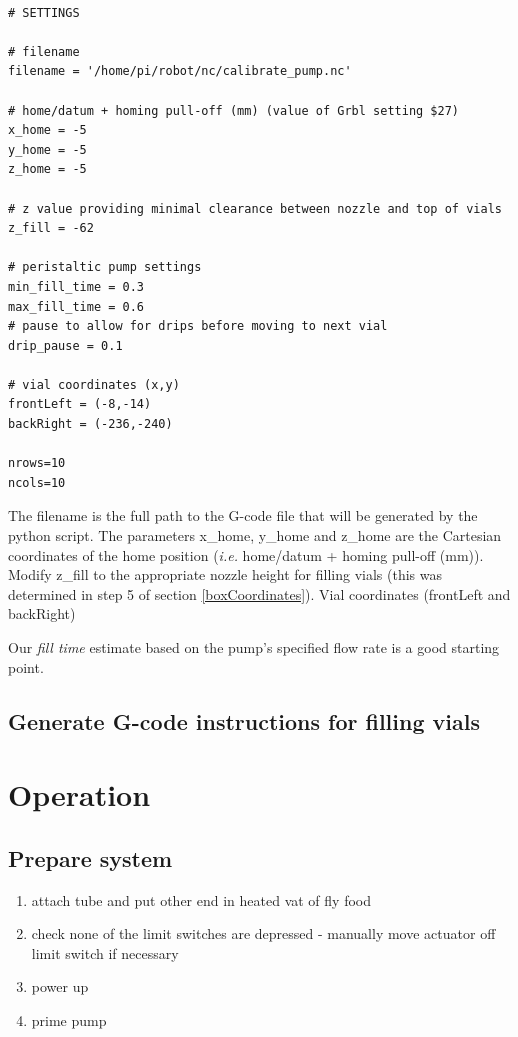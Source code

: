 \documentclass[]{book}
\providecommand{\tightlist}{%
  \setlength{\itemsep}{0pt}\setlength{\parskip}{0pt}}
\theoremstyle{definition}
\theoremstyle{definition}
\theoremstyle{remark}
\begin{document}
\begin{verbatim}

# SETTINGS

# filename
filename = '/home/pi/robot/nc/calibrate_pump.nc'

# home/datum + homing pull-off (mm) (value of Grbl setting $27)
x_home = -5
y_home = -5
z_home = -5

# z value providing minimal clearance between nozzle and top of vials
z_fill = -62 

# peristaltic pump settings
min_fill_time = 0.3
max_fill_time = 0.6
# pause to allow for drips before moving to next vial
drip_pause = 0.1 

# vial coordinates (x,y)
frontLeft = (-8,-14)
backRight = (-236,-240)

nrows=10
ncols=10
\end{verbatim}

The filename is the full path to the G-code file that will be generated
by the python script. The parameters x\_home, y\_home and z\_home are
the Cartesian coordinates of the home position (\emph{i.e.} home/datum +
homing pull-off (mm)). Modify z\_fill to the appropriate nozzle height
for filling vials (this was determined in step 5 of section
\ref{boxCoordinates}). Vial coordinates (frontLeft and backRight)

Our \emph{fill time} estimate based on the pump's specified flow rate is
a good starting point.

\section{Generate G-code instructions for filling
vials}\label{generate-g-code-instructions-for-filling-vials}

\chapter{Operation}\label{operation}

\section{Prepare system}\label{prepare-system}

\begin{enumerate}
\def\labelenumi{\arabic{enumi}.}
\tightlist
\item
  attach tube and put other end in heated vat of fly food
\item
  check none of the limit switches are depressed - manually move
  actuator off limit switch if necessary
\item
  power up
\item
  prime pump
\end{enumerate}
\end{document}
